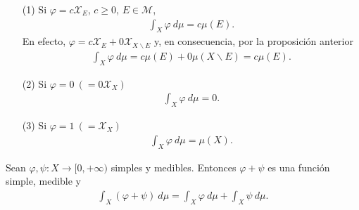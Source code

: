 \begin{obs}
\begin{enumerate}
    \item[(1)] Si $\varphi = c \mathcal{X}_E$, $c \ge 0$, $E \in \mathcal{M}$,
    \begin{align*}
        \int_{X}{\varphi \ d\mu} = c\mu(E).
    \end{align*}
    En efecto, $\varphi = c \mathcal{X}_E + 0 \mathcal{X}_{X \backslash E}$ y, en consecuencia, por la proposición anterior
    \begin{align*}
        \int_{X}{\varphi \ d\mu} = c\mu(E) + 0\mu(X \backslash E) = c\mu(E).
    \end{align*}
    \item[(2)] Si $\varphi = 0 \ (= 0 \mathcal{X}_X)$
    \begin{align*}
        \int_{X}{\varphi \ d\mu} = 0.
    \end{align*}
    \item[(3)] Si $\varphi = 1 \ (= \mathcal{X}_X)$
    \begin{align*}
        \int_{X}{\varphi \ d\mu} = \mu(X).
    \end{align*}
\end{enumerate}
\end{obs}
\begin{prop}
Sean $\varphi, \psi : X \longrightarrow [0,+\infty)$ simples y medibles. Entonces $\varphi + \psi$ es una función simple, medible y
\begin{align*}
    \int_{X}{(\varphi + \psi) \ d\mu} = \int_{X}{\varphi \ d\mu} + \int_{X}{\psi \ d\mu}.
\end{align*}
\end{prop}

